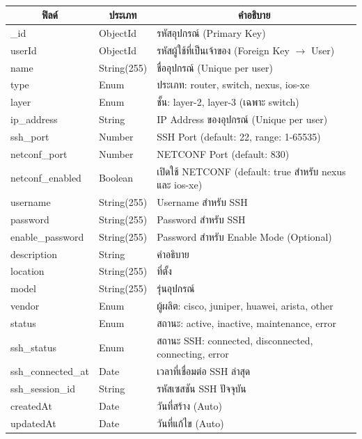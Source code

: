\begin{table}[H]
    \caption{}
    \label{tab:device-structure}
    \fontSixTeen 
    \begin{tabularx}{\textwidth}{|l|l|X|} 
        \hline
        \multicolumn{1}{|c|}{\textbf{ฟิลด์}} & \multicolumn{1}{c|}{\textbf{ประเภท}} & \multicolumn{1}{c|}{\textbf{คำอธิบาย}} \\
        \hline
        \_id & ObjectId & รหัสอุปกรณ์ (Primary Key) \\
        \hline
        userId & ObjectId & รหัสผู้ใช้ที่เป็นเจ้าของ (Foreign Key $\rightarrow$ User) \\
        \hline
        name & String(255) & ชื่ออุปกรณ์ (Unique per user) \\
        \hline
        type & Enum & ประเภท: router, switch, nexus, ios-xe \\
        \hline
        layer & Enum & ชั้น: layer-2, layer-3 (เฉพาะ switch) \\
        \hline
        ip\_address & String & IP Address ของอุปกรณ์ (Unique per user) \\
        \hline
        ssh\_port & Number & SSH Port (default: 22, range: 1-65535) \\
        \hline
        netconf\_port & Number & NETCONF Port (default: 830) \\
        \hline
        netconf\_enabled & Boolean & เปิดใช้ NETCONF (default: true สำหรับ nexus และ ios-xe) \\
        \hline
        username & String(255) & Username สำหรับ SSH \\
        \hline
        password & String(255) & Password สำหรับ SSH \\
        \hline
        enable\_password & String(255) & Password สำหรับ Enable Mode (Optional) \\
        \hline
        description & String & คำอธิบาย \\
        \hline
        location & String(255) & ที่ตั้ง \\
        \hline
        model & String(255) & รุ่นอุปกรณ์ \\
        \hline
        vendor & Enum & ผู้ผลิต: cisco, juniper, huawei, arista, other \\
        \hline
        status & Enum & สถานะ: active, inactive, maintenance, error \\
        \hline
        ssh\_status & Enum & สถานะ SSH: connected, disconnected, connecting, error \\
        \hline
        ssh\_connected\_at & Date & เวลาที่เชื่อมต่อ SSH ล่าสุด \\
        \hline
        ssh\_session\_id & String & รหัสเซสชัน SSH ปัจจุบัน \\
        \hline
        createdAt & Date & วันที่สร้าง (Auto) \\
        \hline
        updatedAt & Date & วันที่แก้ไข (Auto) \\
        \hline
    \end{tabularx}
\end{table}

